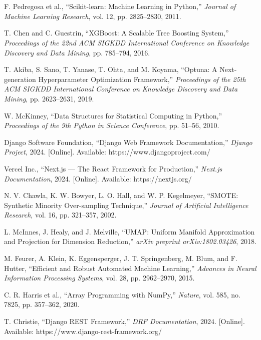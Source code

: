 \documentclass[12pt,a4paper]{report}
\makeatletter
\renewenvironment{thebibliography}[1]
  {\section*{}\@mkboth{}{}%
   \list{\@biblabel{\@arabic\c@enumiv}}%
        {\settowidth\labelwidth{\@biblabel{#1}}%
         \leftmargin\labelwidth
         \advance\leftmargin\labelsep
         \itemsep=0.6\baselineskip
         \usecounter{enumiv}%
         \let\p@enumiv\@empty
         \renewcommand\theenumiv{\@arabic\c@enumiv}}%
   \sloppy}
  {\endlist}
\makeatother
\begin{document}
\begin{thebibliography}{20}

F. Pedregosa et al., ``Scikit-learn: Machine Learning in Python,''
\textit{Journal of Machine Learning Research}, vol. 12, pp. 2825--2830, 2011.

T. Chen and C. Guestrin, ``XGBoost: A Scalable Tree Boosting System,''
\textit{Proceedings of the 22nd ACM SIGKDD International Conference on Knowledge Discovery and Data Mining}, pp. 785--794, 2016.

T. Akiba, S. Sano, T. Yanase, T. Ohta, and M. Koyama, ``Optuna: A Next-generation Hyperparameter Optimization Framework,''
\textit{Proceedings of the 25th ACM SIGKDD International Conference on Knowledge Discovery and Data Mining}, pp. 2623--2631, 2019.

W. McKinney, ``Data Structures for Statistical Computing in Python,''
\textit{Proceedings of the 9th Python in Science Conference}, pp. 51--56, 2010.

Django Software Foundation, ``Django Web Framework Documentation,''
\textit{Django Project}, 2024. [Online]. Available: https://www.djangoproject.com/

Vercel Inc., ``Next.js — The React Framework for Production,''
\textit{Next.js Documentation}, 2024. [Online]. Available: https://nextjs.org/

N. V. Chawla, K. W. Bowyer, L. O. Hall, and W. P. Kegelmeyer, ``SMOTE: Synthetic Minority Over-sampling Technique,''
\textit{Journal of Artificial Intelligence Research}, vol. 16, pp. 321--357, 2002.

L. McInnes, J. Healy, and J. Melville, ``UMAP: Uniform Manifold Approximation and Projection for Dimension Reduction,''
\textit{arXiv preprint arXiv:1802.03426}, 2018.

M. Feurer, A. Klein, K. Eggensperger, J. T. Springenberg, M. Blum, and F. Hutter, ``Efficient and Robust Automated Machine Learning,''
\textit{Advances in Neural Information Processing Systems}, vol. 28, pp. 2962--2970, 2015.

C. R. Harris et al., ``Array Programming with NumPy,''
\textit{Nature}, vol. 585, no. 7825, pp. 357--362, 2020.

T. Christie, ``Django REST Framework,''
\textit{DRF Documentation}, 2024. [Online]. Available: https://www.django-rest-framework.org/


\end{thebibliography}
\end{document}
